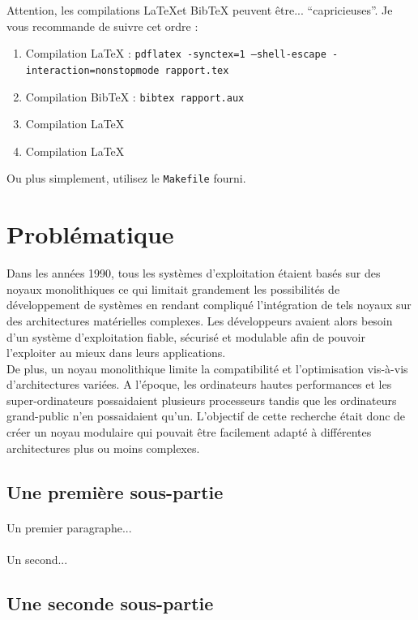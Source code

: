 \documentclass[a4paper, 12pt]{article}
\begin{document}
Attention, les compilations \LaTeX et BibTeX peuvent être... ``capricieuses''. Je vous recommande de suivre cet ordre :
\begin{enumerate}
\item Compilation \LaTeX{} : \texttt{pdflatex -synctex=1 --shell-escape -interaction=nonstopmode rapport.tex}
\item Compilation BibTeX : \texttt{bibtex rapport.aux}
\item Compilation \LaTeX{}
\item Compilation \LaTeX{}
\end{enumerate}
Ou plus simplement, utilisez le \texttt{Makefile} fourni.

\clearpage 
\section{Problématique}

Dans les années 1990, tous les systèmes d'exploitation étaient basés sur des noyaux monolithiques ce qui limitait grandement les possibilités de développement de systèmes en rendant compliqué l'intégration de tels noyaux sur des architectures matérielles complexes. Les développeurs avaient alors besoin d'un système d'exploitation fiable, sécurisé et modulable afin de pouvoir l'exploiter au mieux dans leurs applications. \\
De plus, un noyau monolithique limite la compatibilité et l'optimisation vis-à-vis d'architectures variées. A l'époque, les ordinateurs hautes performances et les super-ordinateurs possaidaient plusieurs processeurs tandis que les ordinateurs grand-public n'en possaidaient qu'un. L'objectif de cette recherche était donc de créer un noyau modulaire qui pouvait être facilement adapté à différentes architectures plus ou moins complexes.

\subsection{Une première sous-partie}
\paragraph{}
Un premier paragraphe...
\paragraph{}
Un second...

\subsection{Une seconde sous-partie}
\end{document}
